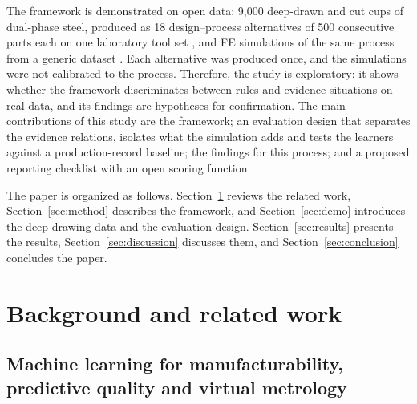 \documentclass[pdflatex,sn-basic,lineno]{sn-jnl}
\begin{document}
The framework is demonstrated on open data: 9,000 deep-drawn and cut cups of dual-phase steel, produced as 18 design--process alternatives of 500 consecutive parts each on one laboratory tool set \citep{baum2026rddac}, and FE simulations of the same process from a generic dataset \citep{baum2025ddacs}. Each alternative was produced once, and the simulations were not calibrated to the process. Therefore, the study is exploratory: it shows whether the framework discriminates between rules and evidence situations on real data, and its findings are hypotheses for confirmation. The main contributions of this study are the framework; an evaluation design that separates the evidence relations, isolates what the simulation adds and tests the learners against a production-record baseline; the findings for this process; and a proposed reporting checklist with an open scoring function.

The paper is organized as follows. Section~\ref{sec:background} reviews the related work, Section~\ref{sec:method} describes the framework, and Section~\ref{sec:demo} introduces the deep-drawing data and the evaluation design. Section~\ref{sec:results} presents the results, Section~\ref{sec:discussion} discusses them, and Section~\ref{sec:conclusion} concludes the paper.

\section{Background and related work}\label{sec:background}

\subsection{Machine learning for manufacturability, predictive quality and virtual metrology}
\end{document}
